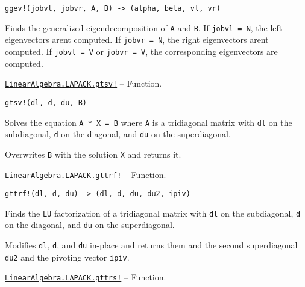\begin{adjustwidth}{2em}{0pt}


\begin{verbatim}
ggev!(jobvl, jobvr, A, B) -> (alpha, beta, vl, vr)
\end{verbatim}

Finds the generalized eigendecomposition of \texttt{A} and \texttt{B}. If \texttt{jobvl = N}, the left eigenvectors aren{\textquotesingle}t computed. If \texttt{jobvr = N}, the right eigenvectors aren{\textquotesingle}t computed. If \texttt{jobvl = V} or \texttt{jobvr = V}, the corresponding eigenvectors are computed.



\end{adjustwidth}
\hypertarget{445174240052873549}{} 
\hyperlink{445174240052873549}{\texttt{LinearAlgebra.LAPACK.gtsv!}}  -- {Function.}

\begin{adjustwidth}{2em}{0pt}


\begin{verbatim}
gtsv!(dl, d, du, B)
\end{verbatim}

Solves the equation \texttt{A * X = B} where \texttt{A} is a tridiagonal matrix with \texttt{dl} on the subdiagonal, \texttt{d} on the diagonal, and \texttt{du} on the superdiagonal.

Overwrites \texttt{B} with the solution \texttt{X} and returns it.



\end{adjustwidth}
\hypertarget{9597724514453362317}{} 
\hyperlink{9597724514453362317}{\texttt{LinearAlgebra.LAPACK.gttrf!}}  -- {Function.}

\begin{adjustwidth}{2em}{0pt}


\begin{verbatim}
gttrf!(dl, d, du) -> (dl, d, du, du2, ipiv)
\end{verbatim}

Finds the \texttt{LU} factorization of a tridiagonal matrix with \texttt{dl} on the subdiagonal, \texttt{d} on the diagonal, and \texttt{du} on the superdiagonal.

Modifies \texttt{dl}, \texttt{d}, and \texttt{du} in-place and returns them and the second superdiagonal \texttt{du2} and the pivoting vector \texttt{ipiv}.



\end{adjustwidth}
\hypertarget{3087963688650638106}{} 
\hyperlink{3087963688650638106}{\texttt{LinearAlgebra.LAPACK.gttrs!}}  -- {Function.}

